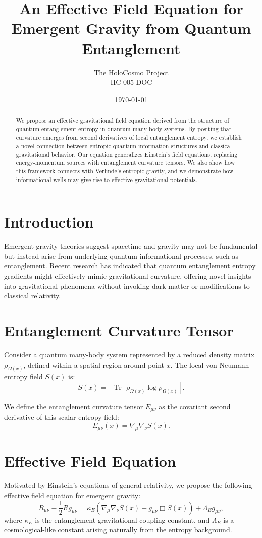 \documentclass[12pt]{article}
\title{An Effective Field Equation for Emergent Gravity from Quantum Entanglement}
\author{The HoloCosmo Project\\HC-005-DOC}
\date{\today}
\begin{document}
\maketitle

\begin{abstract}
We propose an effective gravitational field equation derived from the structure of quantum entanglement entropy in quantum many-body systems. By positing that curvature emerges from second derivatives of local entanglement entropy, we establish a novel connection between entropic quantum information structures and classical gravitational behavior. Our equation generalizes Einstein's field equations, replacing energy-momentum sources with entanglement curvature tensors. We also show how this framework connects with Verlinde's entropic gravity, and we demonstrate how informational wells may give rise to effective gravitational potentials.
\end{abstract}

\section{Introduction}
Emergent gravity theories suggest spacetime and gravity may not be fundamental but instead arise from underlying quantum informational processes, such as entanglement. Recent research has indicated that quantum entanglement entropy gradients might effectively mimic gravitational curvature, offering novel insights into gravitational phenomena without invoking dark matter or modifications to classical relativity.

\section{Entanglement Curvature Tensor}
Consider a quantum many-body system represented by a reduced density matrix \(\rho_{\Omega(x)}\), defined within a spatial region around point \(x\). The local von Neumann entropy field \(S(x)\) is:
\begin{equation}
S(x) = -\mathrm{Tr}[\rho_{\Omega(x)} \log \rho_{\Omega(x)}].
\end{equation}

We define the entanglement curvature tensor \(E_{\mu\nu}\) as the covariant second derivative of this scalar entropy field:
\begin{equation}
E_{\mu\nu}(x) = \nabla_\mu \nabla_\nu S(x).
\end{equation}

\section{Effective Field Equation}
Motivated by Einstein's equations of general relativity, we propose the following effective field equation for emergent gravity:
\begin{equation}
R_{\mu\nu} - \frac{1}{2} R g_{\mu\nu} = \kappa_E \left( \nabla_\mu \nabla_\nu S(x) - g_{\mu\nu}\Box S(x) \right) + \Lambda_E g_{\mu\nu},
\end{equation}
where \(\kappa_E\) is the entanglement-gravitational coupling constant, and \(\Lambda_E\) is a cosmological-like constant arising naturally from the entropy background.
\end{document}
